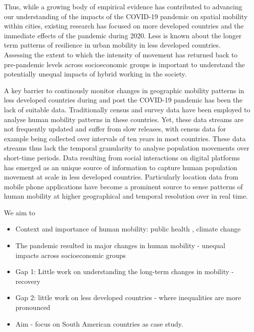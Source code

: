 \documentclass[
  11pt,
]{article}
\providecommand{\tightlist}{%
  \setlength{\itemsep}{0pt}\setlength{\parskip}{0pt}}\usepackage{longtable,booktabs,array}
\begin{document}
Thus, while a growing body of empirical evidence has contributed to
advancing our understanding of the impacts of the COVID-19 pandemic on
spatial mobility within cities, existing research has focused on more
developed countries and the immediate effects of the pandemic during
2020. Less is known about the longer term patterns of resilience in
urban mobility in less developed countries. Assessing the extent to
which the intensity of movement has returned back to pre-pandemic levels
across socioeconomic groups is important to understand the potentially
unequal impacts of hybrid working in the society.

A key barrier to continously monitor changes in geographic mobility
patterns in less developed countries during and post the COVID-19
pandemic has been the lack of suitable data. Traditionally census and
survey data have been employed to analyse human mobility patterns in
these countries. Yet, these data streams are not frequently updated and
suffer from slow releases, with census data for example being collected
over intervals of ten years in most countries. These data streams thus
lack the temporal granularity to analyse population movements over
short-time periods. Data resulting from social interactions on digital
platforms has emerged as an unique source of information to capture
human population movement at scale in less developed countries.
Particularly location data from mobile phone applications have become a
prominent source to sense patterns of human mobility at higher
geographical and temporal resolution over in real time.

We aim to

\begin{itemize}
\tightlist
\item
  Context and importance of human mobility: public health , climate
  change\\
\item
  The pandemic resulted in major changes in human mobility - unequal
  impacts across socioeconomic groups\\
\item
  Gap 1: Little work on understanding the long-term changes in mobility
  - recovery\\
\item
  Gap 2: little work on less developed countries - where inequalities
  are more pronounced\\
\item
  Aim - focus on South American countries as case study.
\end{itemize}
\end{document}
